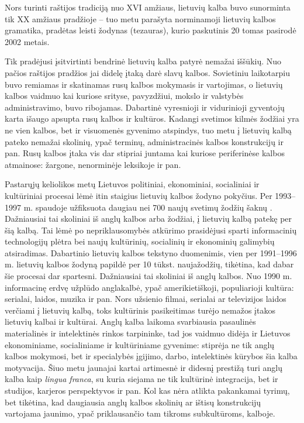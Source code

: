 \begin{multicols}{2}
Nors turinti raštijos tradiciją nuo XVI amžiaus, lietuvių kalba buvo sunorminta tik XX amžiaus pradžioje – tuo metu parašyta norminamoji lietuvių kalbos gramatika, pradėtas leisti žodynas (tezauras), kurio paskutinis 20 tomas pasirodė 2002 metais.  

    Tik pradėjusi įsitvirtinti bendrinė lietuvių kalba patyrė nemažai iššūkių. Nuo pačios raštijos pradžios jai didelę įtaką darė slavų kalbos. Sovietiniu laikotarpiu buvo remiamas ir skatinamas rusų kalbos mokymasis ir vartojimas, o lietuvių kalbos vaidmuo kai kuriose srityse, pavyzdžiui, mokslo ir valstybės administravimo, buvo ribojamas. Dabartinė vyresnioji ir vidurinioji gyventojų karta išaugo apsupta rusų kalbos ir kultūros. Kadangi svetimos kilmės žodžiai yra ne vien kalbos, bet ir visuomenės gyvenimo atspindys, tuo metu į lietuvių kalbą pateko nemažai skolinių, ypač terminų, administracinės kalbos konstrukcijų ir pan. Rusų kalbos įtaka vis dar stipriai juntama kai kuriose periferinėse kalbos atmainose: žargone, nenorminėje leksikoje ir pan.   

    Pastarųjų keliolikos metų Lietuvos politiniai, ekonominiai, socialiniai ir kultūriniai procesai lėmė itin staigius lietuvių kalbos žodyno pokyčius. Per 1993–1997 m. spaudoje užfiksuota daugiau nei 700 naujų svetimų žodžių šaknų \cite{nbi1}. Dažniausiai tai skoliniai iš anglų kalbos arba žodžiai, į lietuvių kalbą patekę per šią kalbą. Tai lėmė po nepriklausomybės atkūrimo prasidėjusi sparti informacinių technologijų plėtra bei naujų kultūrinių, socialinių ir ekonominių galimybių atsiradimas. Dabartinio lietuvių kalbos tekstyno duomenimis, vien per 1991–1996 m. lietuvių kalbos žodyną papildė per 10 tūkst. naujažodžių, tikėtina, kad dabar šie procesai dar spartesni. Dažniausiai tai skoliniai iš anglų kalbos. Nuo 1990 m. informacinę erdvę užplūdo anglakalbė, ypač amerikietiškoji, populiarioji kultūra: serialai, laidos, muzika ir pan. Nors užsienio filmai, serialai ar televizijos laidos verčiami į lietuvių kalbą, toks kultūrinis pasikeitimas turėjo nemažos įtakos lietuvių kalbai ir kultūrai. Anglų kalba laikoma svarbiausia pasaulinės materialinės ir intelektinės rinkos tarpininke, tad jos vaidmuo didėja ir Lietuvos ekonominiame, socialiniame ir kultūriniame gyvenime: stiprėja ne tik anglų kalbos mokymosi, bet ir specialybės įgijimo, darbo, intelektinės kūrybos šia kalba motyvacija. Šiuo metu jaunajai kartai artimesnė ir didesnį prestižą turi anglų kalba kaip \textit{lingua franca}, su kuria siejama ne tik kultūrinė integracija, bet ir studijos, karjeros perspektyvos ir pan. Kol kas nėra atlikta pakankamai tyrimų, bet tikėtina, kad daugiausia anglų kalbos skolinių ar ištisų konstrukcijų vartojama jaunimo, ypač priklausančio tam tikroms subkultūroms, kalboje.   


\end{multicols}
